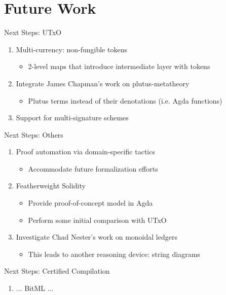 \documentclass[aspectratio=169]{beamer}
\renewcommand\alert[1]{\textcolor{mLightBrown}{#1}}
\begin{document}
\section{Future Work}

\begin{frame}{Next Steps: UTxO}
\begin{enumerate}
\item Multi-currency: \alert{non-fungible tokens}
  \begin{itemize}
  \item 2-level maps that introduce intermediate layer with tokens
  \end{itemize}
\item Integrate James Chapman's work on \alert{plutus-metatheory}
  \begin{itemize}
  \item Plutus terms instead of their denotations (i.e. Agda functions)
  \end{itemize}
\item Support for \alert{multi-signature} schemes
\end{enumerate}
\end{frame}

\begin{frame}{Next Steps: Others}
\begin{enumerate}
\item Proof automation via domain-specific tactics
   \begin{itemize}
   \item Accommodate future formalization efforts
   \end{itemize}
\item Featherweight Solidity
  \begin{itemize}
  \item Provide proof-of-concept model in Agda
  \item Perform some initial comparison with UTxO
  \end{itemize}
\item Investigate Chad Nester's work on \alert{monoidal ledgers}
  \begin{itemize}
  \item This leads to another reasoning device: \alert{string diagrams}
  \end{itemize}
\end{enumerate}
\end{frame}

\begin{frame}{Next Steps: Certified Compilation}
\begin{enumerate}
\item ... BitML ...
\end{enumerate}
\end{frame}
\end{document}
